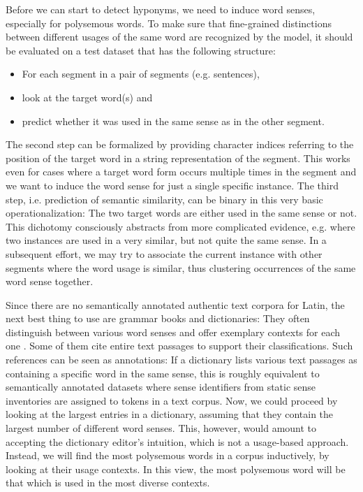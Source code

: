 \documentclass[oneside]{book}
\begin{document}
Before we can start to detect hyponyms, we need to induce word senses, especially for polysemous words. To make sure that fine-grained distinctions between different usages of the same word are recognized by the model, it should be evaluated on a test dataset that has the following structure:
\begin{itemize}
	\item For each segment in a pair of segments (e.g. sentences),
	\item look at the target word(s) and
	\item predict whether it was used in the same sense as in the other segment.
\end{itemize}
The second step can be formalized by providing character indices referring to the position of the target word in a string representation of the segment. This works even for cases where a target word form occurs multiple times in the segment and we want to induce the word sense for just a single specific instance. The third step, i.e. prediction of semantic similarity, can be binary in this very basic operationalization: The two target words are either used in the same sense or not. This dichotomy consciously abstracts from more complicated evidence, e.g. where two instances are used in a very similar, but not quite the same sense. In a subsequent effort, we may try to associate the current instance with other segments where the word usage is similar, thus clustering occurrences of the same word sense together. 

Since there are no semantically annotated authentic text corpora for Latin, the next best thing to use are grammar books and dictionaries: They often distinguish between various word senses and offer exemplary contexts for each one \parencites{georgesAusfuhrlichesLateinischDeutschesHandworterbuch1913}{niederauNavigiumLateinDeutschWorterbuch2012}. Some of them cite entire text passages \parencites{shortLatinDictionary1879}{kuhnerAusfuhrlicheGrammatikLateinischen1914}{mengeLehrbuchLateinischenSyntax2009} to support their classifications. Such references can be seen as annotations: If a dictionary lists various text passages as containing a specific word in the same sense, this is roughly equivalent to semantically annotated datasets where sense identifiers from static sense inventories are assigned to tokens in a text corpus. Now, we could proceed by looking at the largest entries in a dictionary, assuming that they contain the largest number of different word senses. This, however, would amount to accepting the dictionary editor's intuition, which is not a usage-based approach. Instead, we will find the most polysemous words in a corpus inductively, by looking at their usage contexts. In this view, the most polysemous word will be that which is used in the most diverse contexts.
\end{document}
